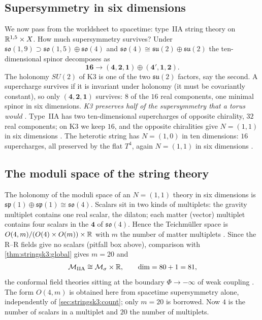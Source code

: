 \subsection{Supersymmetry in six dimensions}
We now pass from the worldsheet to spacetime: type~IIA string theory on
$\mathbb{R}^{1,5}\times X$. How much supersymmetry survives? Under
$\mathfrak{so}(1,9)\supset\mathfrak{so}(1,5)\oplus\mathfrak{so}(4)$ and
$\mathfrak{so}(4)\cong\mathfrak{su}(2)\oplus\mathfrak{su}(2)$ the ten-dimensional spinor
decomposes as
\begin{equation}\label{eq:stringsk3:spinor}
  \mathbf{16}\to(\mathbf4,\mathbf2,\mathbf1)\oplus(\mathbf4',\mathbf1,\mathbf2).
\end{equation}
The holonomy $SU(2)$ of K3 is one of the two $\mathfrak{su}(2)$ factors, say the second. A
supercharge survives if it is invariant under holonomy (it must be covariantly constant), so
only $(\mathbf4,\mathbf2,\mathbf1)$ survives: $8$ of the $16$ real components, one minimal
spinor in six dimensions. \emph{K3 preserves half of the supersymmetry that a torus would}
. Type~IIA has two ten-dimensional supercharges of
opposite chirality, $32$ real components; on K3 we keep $16$, and the opposite chiralities
give $N=(1,1)$ in six dimensions . The heterotic string has $N=(1,0)$ in ten dimensions:
$16$ supercharges, all preserved by the flat $T^4$, again $N=(1,1)$ in six dimensions .

\subsection{The moduli space of the string theory}
The holonomy of the moduli space of an $N=(1,1)$ theory in six dimensions is
$\mathfrak{sp}(1)\oplus\mathfrak{sp}(1)\cong\mathfrak{so}(4)$. Scalars sit in two kinds of
multiplets: the gravity multiplet contains one real scalar, the dilaton; each matter (vector)
multiplet contains four scalars in the $\mathbf4$ of $\mathfrak{so}(4)$. Hence the
Teichm\"uller space is $O(4,m)/(O(4)\times O(m))\times\mathbb{R}$ with $m$ the number of matter
multiplets . Since the R--R fields give no scalars
(pitfall box above), comparison with \cref{thm:stringsk3:global} gives $m=20$ and
\begin{equation}\label{eq:stringsk3:MIIA}
  \mathcal M_{\rm IIA}\cong\mathcal M_\sigma\times\mathbb{R} ,\qquad \dim=80+1=81,
\end{equation}
the conformal field theories sitting at the boundary $\Phi\to-\infty$ of weak coupling
. The form $O(4,m)$ is obtained here from spacetime supersymmetry alone, independently of
\cref{sec:stringsk3:count}; only $m=20$ is borrowed. Now $4$ is the number of scalars in a
multiplet and $20$ the number of multiplets.

